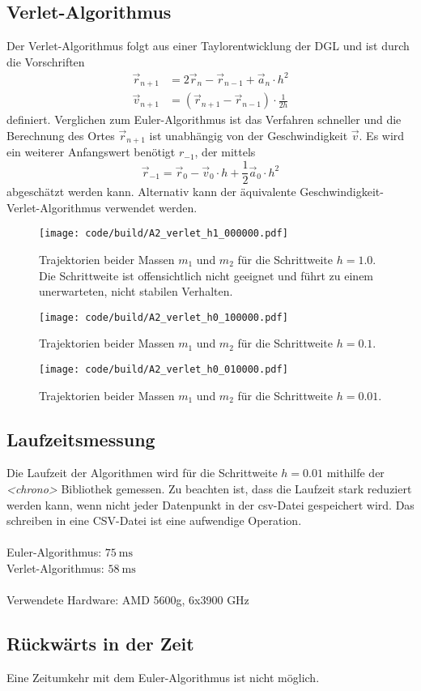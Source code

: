 \subsection{Verlet-Algorithmus}
Der Verlet-Algorithmus folgt aus einer Taylorentwicklung der DGL und ist durch die Vorschriften
\begin{align}
    \vec{r}_{n+1} &= 2 \vec{r}_n - \vec{r}_{n-1} + \vec{a}_n \cdot h^2 \\
    \vec{v}_{n+1} &= (\vec{r}_{n+1} - \vec{r}_{n-1}) \cdot \frac{1}{2h} 
\end{align}
definiert.
Verglichen zum Euler-Algorithmus ist das Verfahren schneller und die Berechnung des Ortes $\vec{r}_{n+1}$ ist unabhängig von der Geschwindigkeit $\vec{v}$.
Es wird ein weiterer Anfangswert benötigt $r_{-1}$, der mittels
\begin{equation}
    \vec{r}_{-1} = \vec{r}_0 - \vec{v}_0 \cdot h + \frac{1}{2} \vec{a}_0 \cdot h^2
\end{equation}
abgeschätzt werden kann.
Alternativ kann der äquivalente Geschwindigkeit-Verlet-Algorithmus verwendet werden.
\begin{figure}
    \centering
    \texttt{[image: code/build/A2\_verlet\_h1\_000000.pdf]}
    \caption{Trajektorien beider Massen $m_1$ und $m_2$ für die Schrittweite $h=1.0$.
    Die Schrittweite ist offensichtlich nicht geeignet und führt zu einem unerwarteten, nicht stabilen Verhalten.
    }
\end{figure}
\begin{figure}
    \centering
    \texttt{[image: code/build/A2\_verlet\_h0\_100000.pdf]}
    \caption{Trajektorien beider Massen $m_1$ und $m_2$ für die Schrittweite $h=0.1$.
    }
\end{figure}
\begin{figure}
    \centering
    \texttt{[image: code/build/A2\_verlet\_h0\_010000.pdf]}
    \caption{Trajektorien beider Massen $m_1$ und $m_2$ für die Schrittweite $h=0.01$.
    }
\end{figure}
\FloatBarrier

\subsection{Laufzeitsmessung}
Die Laufzeit der Algorithmen wird für die Schrittweite $h=0.01$ mithilfe der \textit{<chrono>} Bibliothek gemessen.
Zu beachten ist, dass die Laufzeit stark reduziert werden kann, wenn nicht jeder Datenpunkt in der csv-Datei gespeichert wird.
Das schreiben in eine CSV-Datei ist eine aufwendige Operation.
\\
\\

Euler-Algorithmus: $\qty{75}{\milli\second}$
\\
Verlet-Algorithmus: $\qty{58}{\milli\second}$
\\
\\
Verwendete Hardware: AMD 5600g, 6x3900 GHz

\subsection{Rückwärts in der Zeit}
Eine Zeitumkehr mit dem Euler-Algorithmus ist nicht möglich.